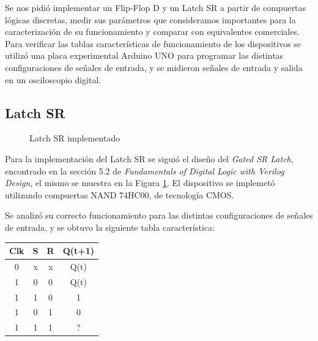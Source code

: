 
Se nos pidió implementar un Flip-Flop D y un Latch SR a partir de compuertas lógicas discretas, medir sus parámetros que consideramos importantes para la caracterización de su funcionamiento y comparar con equivalentes comerciales. Para verificar las tablas características de funcionamiento de los dispositivos se utilizó una placa experimental Arduino UNO para programar las distintas configuraciones de señales de entrada, y se midieron señales de entrada y salida en un osciloscopio digital. 

\subsection*{Latch SR}

%


\newcommand{\myboxa}
{%
    \begin{figure}
\begin{center}
\resizebox{.5\linewidth}{!}{\parbox{\linewidth}{}}
\caption{Latch SR implementado} 
\label{6_fig1}
\end{center}
    \end{figure}\par\noindent
}

\myboxa

Para la implementación del Latch SR se siguió el diseño del \emph{Gated SR Latch}, encontrado en la sección 5.2 de \emph{Fundamentals of Digital Logic with Verilog Design}, el mismo se muestra en la Figura \ref{6_fig1}. El dispositivo se implemetó utilizando compuertas NAND 74HC00, de tecnología CMOS.

Se analizó su correcto funcionamiento para las distintas configuraciones de señales de entrada, y se obtuvo la siguiente tabla característica:

\begin{center}
\begin{tabular}{ccc|c}
Clk & S & R & Q(t+1) \\ 
\hline 
0 & x & x & Q(t) \\ 
1 & 0 & 0 & Q(t) \\ 
1 & 1 & 0 & 1 \\ 
1 & 0 & 1 & 0 \\ 
1 & 1 & 1 & ? \\
\end{tabular} 
\end{center}

